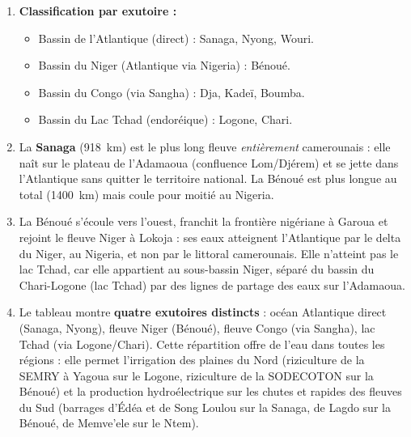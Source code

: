 \documentclass[11pt]{article}
\begin{document}
\begin{corrige}
\begin{enumerate}
\item \textbf{Classification par exutoire :}
\begin{itemize}
\item Bassin de l'Atlantique (direct) : Sanaga, Nyong, Wouri.
\item Bassin du Niger (Atlantique via Nigeria) : Bénoué.
\item Bassin du Congo (via Sangha) : Dja, Kadeï, Boumba.
\item Bassin du Lac Tchad (endoréique) : Logone, Chari.
\end{itemize}
\item La \textbf{Sanaga} (\SI{918}{km}) est le plus long fleuve \emph{entièrement} camerounais : elle naît sur le plateau de l'Adamaoua (confluence Lom/Djérem) et se jette dans l'Atlantique sans quitter le territoire national. La Bénoué est plus longue au total (\SI{1400}{km}) mais coule pour moitié au Nigeria.
\item La Bénoué s'écoule vers l'ouest, franchit la frontière nigériane à Garoua et rejoint le fleuve Niger à Lokoja : ses eaux atteignent l'Atlantique par le delta du Niger, au Nigeria, et non par le littoral camerounais. Elle n'atteint pas le lac Tchad, car elle appartient au sous-bassin Niger, séparé du bassin du Chari-Logone (lac Tchad) par des lignes de partage des eaux sur l'Adamaoua.
\item Le tableau montre \textbf{quatre exutoires distincts} : océan Atlantique direct (Sanaga, Nyong), fleuve Niger (Bénoué), fleuve Congo (via Sangha), lac Tchad (via Logone/Chari). Cette répartition offre de l'eau dans toutes les régions : elle permet l'irrigation des plaines du Nord (riziculture de la SEMRY à Yagoua sur le Logone, riziculture de la SODECOTON sur la Bénoué) et la production hydroélectrique sur les chutes et rapides des fleuves du Sud (barrages d'Édéa et de Song Loulou sur la Sanaga, de Lagdo sur la Bénoué, de Memve'ele sur le Ntem).
\end{enumerate}
\end{corrige}
\end{document}
